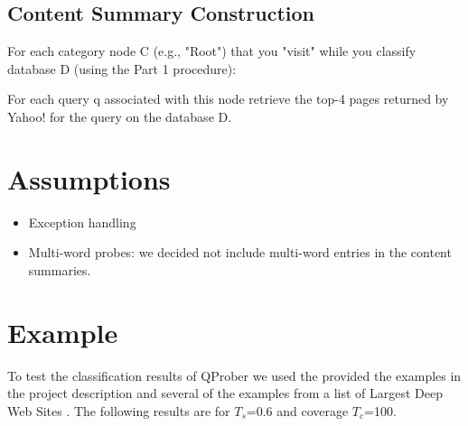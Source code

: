 \documentclass[11pt]{article}
\begin{document}
\subsection{Content Summary Construction}

For each category node C (e.g., "Root") that you "visit" while you classify database D (using the Part 1 procedure):

    For each query q associated with this node retrieve the top-4 pages returned by Yahoo! for the query on the database D.


\section{Assumptions}

\begin{itemize}
\item Exception handling
\item Multi-word probes: we decided not include multi-word entries in the content summaries.
\end{itemize}

\section{Example}
To test the classification results of QProber we used the provided the examples in the project description and several of the examples from a list
of Largest Deep Web Sites \cite{AIP}. The following results are for $T_s$=0.6 and coverage $T_c$=100.
\end{document}
